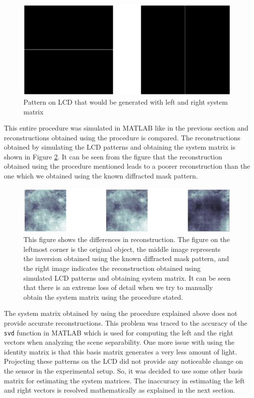 \begin{figure}[h]
\centering
\includegraphics[width = \linewidth]{pics/identity_left_right.png}
\caption{Pattern on LCD that would be generated with left and right system matrix}
\label{fig:pattern_identity}
\end{figure}
This entire procedure was simulated in MATLAB like in the previous section and reconstructions obtained using the procedure is compared. The reconstructions obtained by simulating the LCD patterns and obtaining the system matrix is shown in Figure \ref{fig:rec_id}. It can be seen from the figure that the reconstruction obtained using the procedure mentioned leads to a poorer reconstruction than the one which we obtained using the known diffracted mask pattern.
\begin{figure}[h]
\centering
\includegraphics[width = \linewidth]{pics/id_reconst.png}
\caption{This figure shows the differences in reconstruction. The figure on the leftmost corner is the original object, the middle image represents the inversion obtained using the known diffracted mask pattern, and the right image indicates the reconstruction obtained using simulated LCD patterns and obtaining system matrix. It can be seen that there is an extreme loss of detail when we try to manually obtain the system matrix using the procedure stated.}
\label{fig:rec_id}
\end{figure}
The system matrix obtained by using the procedure explained above does not provide accurate reconstructions. This problem was traced to the accuracy of the \texttt{svd} function in MATLAB which is used for computing the left and the right vectors when analyzing the scene separability. One more issue with using the identity matrix is that this basis matrix generates a very less amount of light. Projecting these patterns on the LCD did not provide any noticeable change on the sensor in the experimental setup. So, it was decided to use some other basis matrix for estimating the system matrices. The inaccuracy in estimating the left and right vectors is resolved mathematically as explained in the next section. 
